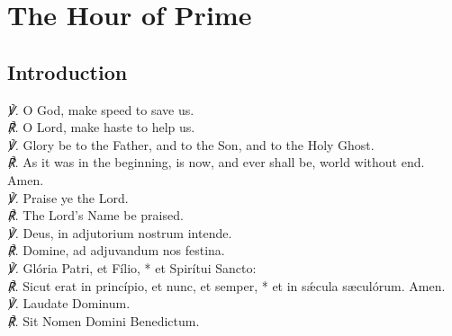 \section{The Hour of Prime}
\subsection{Introduction}
\englat
{
\textit{\scshape ℣.} O God, {} make speed to save us.\\
\textit{\scshape ℟.} O Lord, make haste to help us.\\
\textit{\scshape ℣.} Glory be to the Father, and to the Son, and to the Holy Ghost.\\
\textit{\scshape ℟.} As it was in the beginning, is now, and ever shall be, world without end. Amen.\\
\textit{\scshape ℣.} Praise ye the Lord.\\
\textit{\scshape ℟.} The Lord's Name be praised.\\
}
{
\textit{\scshape ℣.} Deus, {} in adjutorium nostrum intende.\\
\textit{\scshape ℟.} Domine, ad adjuvandum nos festina.\\
\textit{\scshape ℣.} Glória Patri, et Fílio, * et Spirítui Sancto:\\
\textit{\scshape ℟.} Sicut erat in princípio, et nunc, et semper, * et in sǽcula s{\ae}culórum. Amen.\\
\textit{\scshape ℣.} Laudate Dominum.\\
\textit{\scshape ℟.} Sit Nomen Domini Benedictum.\\
}
